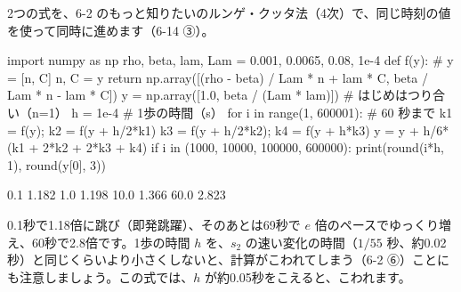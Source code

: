 2つの式を、6-2 のもっと知りたいのルンゲ・クッタ法（4次）で、同じ時刻の値を使って同時に進めます（6-14 ③）。
\begin{phcode}[Python]
import numpy as np
rho, beta, lam, Lam = 0.001, 0.0065, 0.08, 1e-4
def f(y):                        \# y = [n, C]
    n, C = y
    return np.array([(rho - beta) / Lam * n + lam * C,
                     beta / Lam * n - lam * C])
y = np.array([1.0, beta / (Lam * lam)])   \# はじめはつり合い（n=1）
h = 1e-4                         \# 1歩の時間（s）
for i in range(1, 600001):       \# 60 秒まで
    k1 = f(y); k2 = f(y + h/2*k1)
    k3 = f(y + h/2*k2); k4 = f(y + h*k3)
    y = y + h/6*(k1 + 2*k2 + 2*k3 + k4)
    if i in (1000, 10000, 100000, 600000):
        print(round(i*h, 1), round(y[0], 3))
\end{phcode}
\begin{phcodeout}[実行結果]
0.1 1.182
1.0 1.198
10.0 1.366
60.0 2.823
\end{phcodeout}
0.1秒で1.18倍に跳び（即発跳躍）、そのあとは69秒で $e$ 倍のペースでゆっくり増え、60秒で2.8倍です。1歩の時間 $h$ を、$s_2$ の速い変化の時間（$1/55$ 秒、約0.02秒）と同じくらいより小さくしないと、計算がこわれてしまう（6-2 ⑥）ことにも注意しましょう。この式では、$h$ が約0.05秒をこえると、こわれます。

\begin{bkfigure}
\label{ph:原-15:fig-kinetics}
\end{bkfigure}

